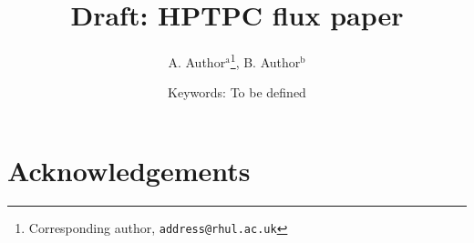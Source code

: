 \documentclass[11pt,a4paper]{article}
\begin{document}
\title{Draft: HPTPC flux paper}
\author{A. Author$^{\textrm{a}}$\thanks{Corresponding author, \texttt{address@rhul.ac.uk}}{}, B. Author$^{\textrm{b}}$}


\date{Keywords: To be defined}

\begin{abstract}

\end{abstract}



\maketitle
\linenumbers











\newenvironment{acknowledgement}{\relax}{\relax}
\begin{acknowledgement}
\section*{Acknowledgements}

\end{acknowledgement}


\AtNextBibliography{\small}
\printbibliography[heading=bibintoc]
\end{document}
